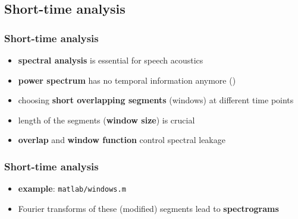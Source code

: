 
\subsection{Short-time analysis}

\begin{frame} %
	\frametitle{Short-time analysis}
	\begin{itemize}
		\item \textbf{spectral analysis} is essential for speech acoustics
		\item \textbf{power spectrum} has no temporal information anymore ()
			\begin{figure}
				\centering
				\begin{subfigure}[c]{0.48\linewidth}
				\end{subfigure}
				\hspace{0.01\linewidth}
				\begin{subfigure}[c]{0.48\linewidth}
				\end{subfigure}
			\end{figure}
		\item choosing \textbf{short overlapping segments} (windows) at different time points
		\item length of the segments (\textbf{window size}) is crucial
		\item \textbf{overlap} and \textbf{window function} control spectral leakage
	\end{itemize}
\end{frame}

\begin{frame} %
	\frametitle{Short-time analysis}
	\begin{itemize}
		\item \textbf{example}: \texttt{matlab/windows.m}
			\begin{figure}
				\centering
				\begin{subfigure}[c]{0.8\linewidth}
				\end{subfigure}
			\end{figure}
		\item Fourier transforms of these (modified) segments lead to \textbf{spectrograms}
	\end{itemize}
\end{frame}

